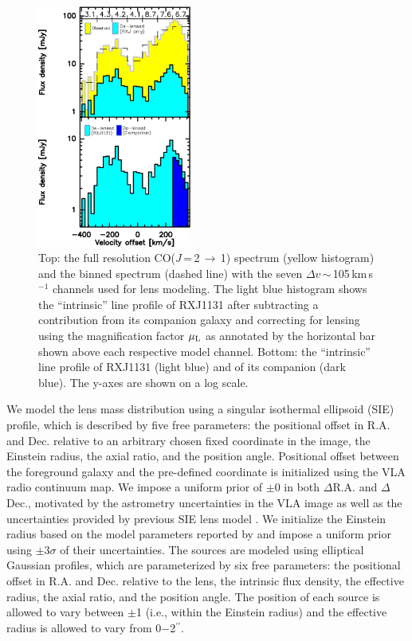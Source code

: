 \documentclass[]{emulateapj}
\newcommand{\rarr}{$\rightarrow$}
\newcommand{\bco}{\mbox{CO($J$\,=\,2\,\rarr\,1)}\xspace}
\newcommand{\kms}{\mbox{km\,s$^{-1}$}\xspace}
\begin{document}
\begin{figure}[!htbp]
\includegraphics[width=0.45\textwidth]{f5.pdf}
\caption{Top: the full resolution \bco spectrum (yellow histogram) and
the binned spectrum (dashed line) with the seven $\Delta v$\,$\sim$\,105\,\kms channels used for lens modeling. The
light blue histogram shows the ``intrinsic'' line profile of RXJ1131
after subtracting a contribution from its companion galaxy and
correcting for lensing using the magnification factor $\mu_{\rm L}$ as annotated by the horizontal bar shown
above each respective model channel.
Bottom: the ``intrinsic'' line profile of RXJ1131 (light blue) and of its companion (dark blue).
The y-axes are shown on a log scale.
\label{fig:delensed}}
\end{figure}

We model the lens mass distribution using a singular isothermal
ellipsoid (SIE) profile, which is described by five free parameters: the
positional offset in R.A. and Dec. relative to an arbitrary chosen
fixed coordinate in the image, the Einstein radius, the axial ratio, and the
position angle.
Positional offset between the foreground galaxy and the pre-defined coordinate is initialized
using the VLA radio continuum map.
We impose a
uniform prior of $\pm$0 in both $\Delta$R.A. and $\Delta$Dec.,
motivated by the astrometry uncertainties in the VLA image as well as
the uncertainties provided by previous SIE lens model .
We initialize the Einstein radius based on the model parameters reported by 
and impose a uniform prior using $\pm$3$\sigma$ of their uncertainties.
The sources are modeled using elliptical Gaussian profiles, which are
parameterized by six free parameters: the positional offset in R.A.
and Dec. relative to the lens, the intrinsic flux density, the effective
radius, the axial ratio, and the position angle. The position of each source
is allowed to vary between $\pm$1 (i.e., within the Einstein radius)
and the effective radius is allowed to vary from 0$-$2$^{\prime\prime}$.
\end{document}
